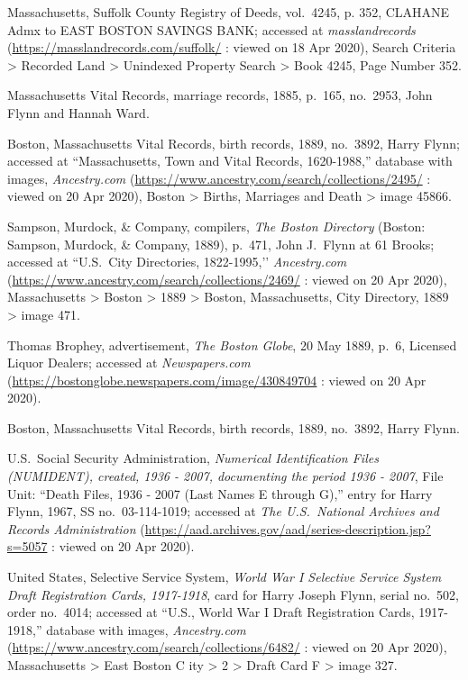 \begin{thebibliography}{999}
Massachusetts, Suffolk County Registry of Deeds, vol.\ 4245, p. 352, CLAHANE Admx to EAST BOSTON SAVINGS BANK; accessed at \textit{masslandrecords} (\url{https://masslandrecords.com/suffolk/} : viewed on 18 Apr 2020), Search Criteria > Recorded Land > Unindexed Property Search > Book 4245, Page Number 352.

Massachusetts Vital Records, marriage records, 1885, p.\ 165, no.\ 2953, John Flynn and Hannah Ward.

Boston, Massachusetts Vital Records, birth records, 1889, no.\ 3892, Harry Flynn; accessed at ``Massachusetts, Town and Vital Records, 1620-1988,'' database with images, \textit{Ancestry.com} (\url{https://www.ancestry.com/search/collections/2495/} : viewed on 20 Apr 2020), Boston > Births, Marriages and Death > image 45866.

Sampson, Murdock, \& Company, compilers, \textit{The Boston Directory} (Boston: Sampson, Murdock, \& Company, 1889), p.\ 471, John J.\ Flynn at 61 Brooks; accessed at ``U.S.\ City Directories, 1822-1995,’’ \textit{Ancestry.com} (\url{https://www.ancestry.com/search/collections/2469/} : viewed on 20 Apr 2020), Massachusetts > Boston > 1889 > Boston, Massachusetts, City Directory, 1889 > image 471.

Thomas Brophey, advertisement, \textit{The Boston Globe}, 20 May 1889, p.\ 6, Licensed Liquor Dealers; accessed at \textit{Newspapers.com} (\url{https://bostonglobe.newspapers.com/image/430849704} : viewed on 20 Apr 2020).

Boston, Massachusetts Vital Records, birth records, 1889, no.\ 3892, Harry Flynn.

U.S.\ Social Security Administration, \textit{Numerical Identification Files (NUMIDENT), created, 1936 - 2007, documenting the period 1936 - 2007}, File Unit: ``Death Files, 1936 - 2007 (Last Names E through G),'' entry for Harry Flynn, 1967,  SS no.\ 03-114-1019; accessed at \textit{The U.S.\ National Archives and Records Administration} (\url{https://aad.archives.gov/aad/series-description.jsp?s=5057} : viewed on 20 Apr 2020).

United States, Selective Service System, \textit{World War I Selective Service System Draft Registration Cards, 1917-1918}, card for Harry Joseph Flynn, serial no.\ 502, order no.\ 4014; accessed at ``U.S., World War I Draft Registration Cards, 1917-1918,'' database with images, \textit{Ancestry.com} (\url{https://www.ancestry.com/search/collections/6482/} : viewed on 20 Apr 2020), Massachusetts > East Boston C ity > 2 > Draft Card F > image 327.


\end{thebibliography}

